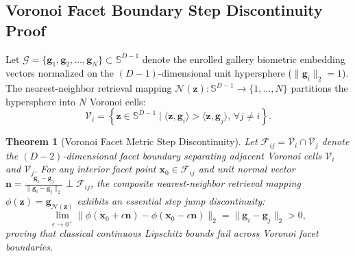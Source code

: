 \documentclass[conference]{IEEEtran}
\newtheorem{theorem}{Theorem}
\begin{document}
\subsection{Voronoi Facet Boundary Step Discontinuity Proof}
Let $\mathcal{G} = \{\mathbf{g}_1, \mathbf{g}_2, \dots, \mathbf{g}_N\} \subset \mathbb{S}^{D-1}$ denote the enrolled gallery biometric embedding vectors normalized on the $(D-1)$-dimensional unit hypersphere ($\|\mathbf{g}_i\|_2 = 1$). The nearest-neighbor retrieval mapping $\mathcal{N}(\mathbf{z}): \mathbb{S}^{D-1} \to \{1, \dots, N\}$ partitions the hypersphere into $N$ Voronoi cells:
\begin{equation}
\mathcal{V}_i = \left\{ \mathbf{z} \in \mathbb{S}^{D-1} \mid \langle \mathbf{z}, \mathbf{g}_i \rangle > \langle \mathbf{z}, \mathbf{g}_j \rangle, \, \forall j \neq i \right\}.
\end{equation}

\begin{theorem}[Voronoi Facet Metric Step Discontinuity]
\label{thm:voronoi_discontinuity}
Let $\mathcal{F}_{ij} = \overline{\mathcal{V}}_i \cap \overline{\mathcal{V}}_j$ denote the $(D-2)$-dimensional facet boundary separating adjacent Voronoi cells $\mathcal{V}_i$ and $\mathcal{V}_j$. For any interior facet point $\mathbf{x}_0 \in \mathcal{F}_{ij}$ and unit normal vector $\mathbf{n} = \frac{\mathbf{g}_i - \mathbf{g}_j}{\|\mathbf{g}_i - \mathbf{g}_j\|_2} \perp \mathcal{F}_{ij}$, the composite nearest-neighbor retrieval mapping $\phi(\mathbf{z}) = \mathbf{g}_{\mathcal{N}(\mathbf{z})}$ exhibits an essential step jump discontinuity:
\begin{equation}
\lim_{\epsilon \to 0^+} \|\phi(\mathbf{x}_0 + \epsilon \mathbf{n}) - \phi(\mathbf{x}_0 - \epsilon \mathbf{n})\|_2 = \|\mathbf{g}_i - \mathbf{g}_j\|_2 > 0,
\end{equation}
proving that classical continuous Lipschitz bounds fail across Voronoi facet boundaries.
\end{theorem}
\end{document}
